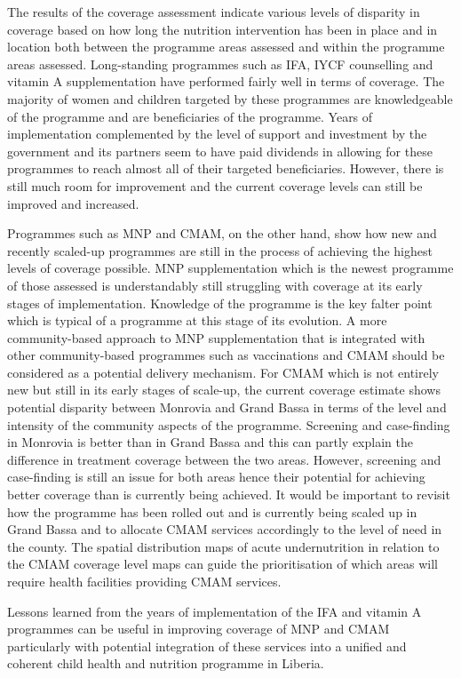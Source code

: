 \documentclass[12pt,a4paper]{article}
\theoremstyle{definition}
\theoremstyle{definition}
\theoremstyle{definition}
\theoremstyle{remark}
\begin{document}
The results of the coverage assessment indicate various levels of
disparity in coverage based on how long the nutrition intervention has
been in place and in location both between the programme areas assessed
and within the programme areas assessed. Long-standing programmes such
as IFA, IYCF counselling and vitamin A supplementation have performed
fairly well in terms of coverage. The majority of women and children
targeted by these programmes are knowledgeable of the programme and are
beneficiaries of the programme. Years of implementation complemented by
the level of support and investment by the government and its partners
seem to have paid dividends in allowing for these programmes to reach
almost all of their targeted beneficiaries. However, there is still much
room for improvement and the current coverage levels can still be
improved and increased.

Programmes such as MNP and CMAM, on the other hand, show how new and
recently scaled-up programmes are still in the process of achieving the
highest levels of coverage possible. MNP supplementation which is the
newest programme of those assessed is understandably still struggling
with coverage at its early stages of implementation. Knowledge of the
programme is the key falter point which is typical of a programme at
this stage of its evolution. A more community-based approach to MNP
supplementation that is integrated with other community-based programmes
such as vaccinations and CMAM should be considered as a potential
delivery mechanism. For CMAM which is not entirely new but still in its
early stages of scale-up, the current coverage estimate shows potential
disparity between Monrovia and Grand Bassa in terms of the level and
intensity of the community aspects of the programme. Screening and
case-finding in Monrovia is better than in Grand Bassa and this can
partly explain the difference in treatment coverage between the two
areas. However, screening and case-finding is still an issue for both
areas hence their potential for achieving better coverage than is
currently being achieved. It would be important to revisit how the
programme has been rolled out and is currently being scaled up in Grand
Bassa and to allocate CMAM services accordingly to the level of need in
the county. The spatial distribution maps of acute undernutrition in
relation to the CMAM coverage level maps can guide the prioritisation of
which areas will require health facilities providing CMAM services.

Lessons learned from the years of implementation of the IFA and vitamin
A programmes can be useful in improving coverage of MNP and CMAM
particularly with potential integration of these services into a unified
and coherent child health and nutrition programme in Liberia.
\end{document}

